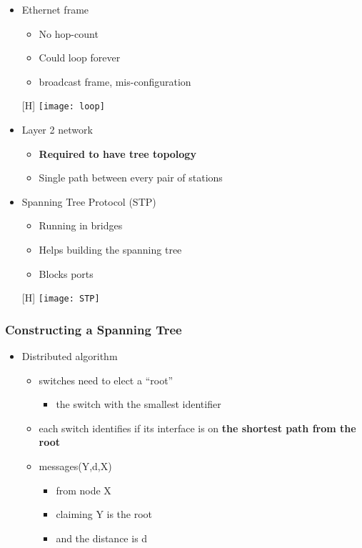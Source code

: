 \documentclass[../resumosRCOM.tex]{subfiles}
\begin{document}
\begin{itemize}
    \item Ethernet frame
    \begin{itemize}
        \item No hop-count
        \item Could loop forever
        \item broadcast frame, mis-configuration
    \end{itemize}
    \begin{center}[H]
        \texttt{[image: loop]}
    \end{center}
    \item Layer 2 network
    \begin{itemize}
        \item \textbf{Required to have tree topology}
        \item Single path between every pair of stations
    \end{itemize}
    \item Spanning Tree Protocol (STP)
    \begin{itemize}
        \item Running in bridges
        \item Helps building the spanning tree
        \item Blocks ports
    \end{itemize}
    \begin{center}[H]
        \texttt{[image: STP]}
    \end{center}
\end{itemize}

\subsubsection{Constructing a Spanning Tree}

\begin{itemize}
    \item Distributed algorithm
    \begin{itemize}
        \item switches need to elect a “root”
        \begin{itemize}
            \item the switch with the smallest identifier
        \end{itemize}
        \item each switch identifies if its interface is on \textbf{the shortest path from the root}
        \item messages(Y,d,X)
        \begin{itemize}
            \item from node X
            \item claiming Y is the root
            \item and the distance is d
        \end{itemize}
    \end{itemize}
\end{itemize}
\end{document}
